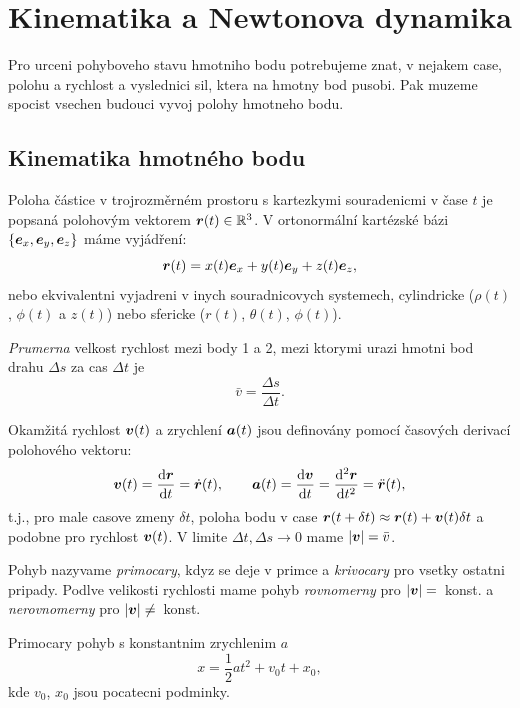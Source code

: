 \chapter{Kinematika a Newtonova dynamika}

Pro urceni pohyboveho stavu hmotniho bodu potrebujeme znat, v nejakem case, polohu a rychlost a vyslednici sil, ktera na hmotny bod pusobi. Pak muzeme spocist vsechen budouci vyvoj polohy hmotneho bodu.

\section{Kinematika hmotného bodu}
Poloha částice v trojrozměrném prostoru s kartezkymi souradenicmi v čase $t$ je popsaná polohovým vektorem $\bm{r}(t) \in \mathbb{R}^3$. V ortonormální kartézské bázi $\{\bm{e}_x, \bm{e}_y, \bm{e}_z\}$ máme vyjádření:
\begin{equation}
    \bm{r}(t) = x(t)\bm{e}_x + y(t)\bm{e}_y + z(t)\bm{e}_z,
\end{equation}
nebo ekvivalentni vyjadreni v inych souradnicovych systemech, cylindricke ($\rho(t)$, $\phi(t)$ a $z(t)$) nebo sfericke ($r(t)$, $\theta(t)$, $\phi(t)$).

\emph{Prumerna} velkost rychlost mezi body 1 a 2, mezi ktorymi urazi hmotni bod drahu $\Delta s$ za cas $\Delta t$ je
$$ \bar{v} = \frac{\Delta s}{\Delta t}. $$

Okamžitá rychlost $\bm{v}(t)$ a zrychlení $\bm{a}(t)$ jsou definovány pomocí časových derivací polohového vektoru:
\begin{equation}
    \bm{v}(t) = \frac{\mathop{}\!\mathrm{d} \bm{r}}{\mathop{}\!\mathrm{d} t} = \dot{\bm{r}}(t), \qquad
    \bm{a}(t) = \frac{\mathop{}\!\mathrm{d} \bm{v}}{\mathop{}\!\mathrm{d} t} = \frac{\mathop{}\!\mathrm{d}^2 \bm{r}}{\mathop{}\!\mathrm{d} t^2} = \ddot{\bm{r}}(t),
\end{equation}
t.j., pro male casove zmeny $\delta t$, poloha bodu v case $\bm{r}(t + \delta t) \approx \bm{r}(t) + \bm{v}(t)\delta t$ a podobne pro rychlost $\bm{v}(t)$. V limite $\Delta t, \Delta s \to 0$ mame $|\bm{v}| = \bar{v}$.

Pohyb nazyvame \emph{primocary}, kdyz se deje v primce a \emph{krivocary} pro vsetky ostatni pripady. Podlve velikosti rychlosti mame pohyb \emph{rovnomerny} pro $|\bm{v}|=$~konst. a \emph{nerovnomerny} pro $|\bm{v}|\neq$~konst.

Primocary pohyb s konstantnim zrychlenim $a$
$$ x = \frac{1}{2}a t^2 + v_0 t + x_0, $$
kde $v_0$, $x_0$ jsou pocatecni podminky.


